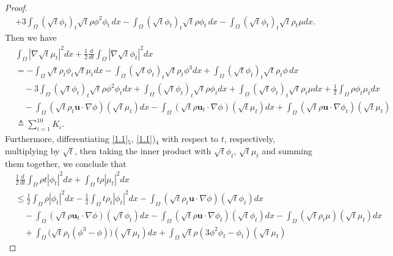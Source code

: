 \documentclass[11pt]{article}
\numberwithin{equation}{section}
\begin{document}
\begin{proof}
\begin{align*}
&+ 3 \int_{\Omega} (\sqrt{t} \phi_t)_t \sqrt{t} \rho \phi^2 \phi_t \, dx - \int_{\Omega} (\sqrt{t} \phi_t)_t \sqrt{t} \rho \phi_t \, dx - \int_{\Omega} (\sqrt{t} \phi_t)_t \sqrt{t} \rho_t \mu dx.
\end{align*}
Then we have
\begin{equation}\label{eq-32}
\begin{split}
&\int_{\Omega} |\nabla \sqrt{t} \mu_t|^2 dx + \frac{1}{2} \frac{d}{dt} \int_{\Omega} |\nabla \sqrt{t} \phi_t|^2 dx\\& = -\int_{\Omega} \sqrt{t} \rho_t \phi_t \sqrt{t} \mu_t dx - \int_{\Omega} (\sqrt{t} \phi_t)_t \sqrt{t} \rho_t \phi^3 dx + \int_{\Omega} (\sqrt{t} \phi_t)_t \sqrt{t} \rho_t \phi \, dx\\
 &\quad- 3\int_{\Omega} (\sqrt{t} \phi_t)_t \sqrt{t} \rho \phi^2 \phi_t dx + \int_{\Omega}
 (\sqrt{t} \phi_t)_t \sqrt{t} \rho \phi_t dx + \int_{\Omega} (\sqrt{t} \phi_t)_t \sqrt{t} \rho_t \mu dx + \frac{1}{2} \int_{\Omega} \rho\phi_t \mu_t dx \\
&\quad- \int_{\Omega} (\sqrt{t} \rho_t \mathbf{u}\cdot \nabla\phi)(\sqrt{t} \mu_t) dx
- \int_{\Omega} (\sqrt{t} \rho \mathbf{u}_t \cdot\nabla\phi)(\sqrt{t} \mu_t) dx + \int_{\Omega} (\sqrt{t} \rho \mathbf{u}\cdot \nabla\phi_t)(\sqrt{t} \mu_t) \\&\triangleq\sum_{i=1}^{10} K_i.
\end{split}
\end{equation}
Furthermore, differentiating \eqref{1.1}$_5$, \eqref{1.1})$_4$ with respect to $t$, respectively, multiplying by $\sqrt t$, then taking the inner product with $\sqrt t \phi_t$, $\sqrt t \mu_t$ and summing them together,  we conclude that
\begin{equation}\label{eq-33}
\begin{split}
&\frac{1}{2} \frac{d}{dt} \int_{\Omega}  \rho t|\phi_t|^2 dx + \int_{\Omega}t\rho |\mu_t|^2 dx
\\&\leq \frac{1}{2} \int_{\Omega} \rho|\phi_t|^2 dx-\frac{1}{2} \int_{\Omega} t\rho_t|\phi_t|^2 dx - \int_{\Omega} (\sqrt{t} \rho_t \mathbf{u}\cdot \nabla\phi)(\sqrt{t} \phi_t) dx \\
&\quad- \int_{\Omega} (\sqrt{t} \rho \mathbf{u}_t\cdot \nabla\phi)(\sqrt{t} \phi_t) dx - \int_{\Omega} (\sqrt{t} \rho \mathbf{u}\cdot \nabla\phi_t)(\sqrt{t} \phi_t) dx - \int_{\Omega} (\sqrt{t} \rho_t \mu)(\sqrt{t} \mu_t) dx \\
&\quad+ \int_{\Omega} \bigl(\sqrt{t} \rho_t (\phi^3 - \phi)\bigr)(\sqrt{t} \mu_t) dx + \int_{\Omega} \sqrt{t} \rho (3\phi^2 \phi_t - \phi_t)(\sqrt{t} \mu_t)

\end{split}
\end{equation}
\end{proof}
\end{document}
